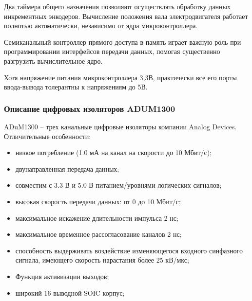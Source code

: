        Два таймера общего назначения позволяют осуществлять обработку данных
        инкрементных энкодеров. Вычисление положения вала электродвигателя
        работает полнотью автоматически, независимо от ядра микроконтроллера.

        Семиканальный контроллер прямого доступа в память играет важную роль при
        программировании интерфейсов передачи данных, помогая существенно разгрузить
        вычислительное ядро.

        Хотя напряжение питания микроконтроллера 3,3В, практически все его
        порты ввода-вывода толерантны к напряжениям до 5В.

    \subsubsection{Описание цифровых изоляторов ADUM1300}
        ADuM1300 – трех канальные цифровые изоляторы компании Analog Devices.
        Отличительные особенности:
        \begin{itemize}
            \item низкое потребление (1.0 мА на канал на скорости до 10
                Мбит/с);
            \item двунаправленная передача данных;
            \item совместим с 3.3 В и 5.0 В питанием/уровнями логических
                сигналов;
            \item высокая скорость передачи данных: от 0 до 10 Мбит/с;
            \item максимальное искажение длительности импульса 2 нс;
            \item максимальное временное рассогласование каналов 2 нс;
            \item способность выдерживать воздействие изменяющегося входного
                синфазного сигнала, имеющего скорость нарастания более 25
                кВ/мкс;
            \item Функция активизации выходов;
            \item широкий 16 выводной SOIC корпус;
        \end{itemize}

